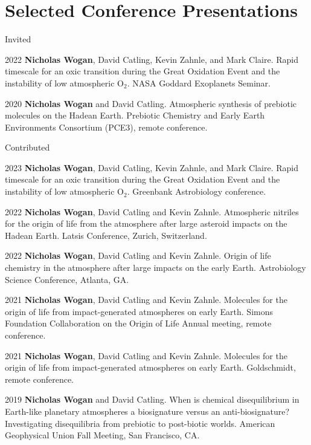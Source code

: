 \documentclass{article}
\begin{document}
\section{Selected Conference Presentations}

\noindent Invited

\begin{cvlist}
\item[2022]
  \textbf{Nicholas Wogan}, David Catling, Kevin Zahnle, and Mark Claire. Rapid timescale for an oxic transition during the Great Oxidation Event and the instability of low atmospheric O$_2$. NASA Goddard Exoplanets Seminar.
\item[2020] 
  \textbf{Nicholas Wogan} and David Catling. Atmospheric synthesis of prebiotic molecules on the Hadean Earth. Prebiotic Chemistry and Early Earth Environments Consortium (PCE3), remote conference.
\end{cvlist}

\noindent Contributed

\begin{cvlist}
\item[2023]
  \textbf{Nicholas Wogan}, David Catling, Kevin Zahnle, and Mark Claire. Rapid timescale for an oxic transition during the Great Oxidation Event and the instability of low atmospheric O$_2$. Greenbank Astrobiology conference.
\item[2022]
  \textbf{Nicholas Wogan}, David Catling and Kevin Zahnle. Atmospheric nitriles for the origin of life from the atmosphere after large asteroid impacts on the Hadean Earth. Latsis Conference, Zurich, Switzerland.
\item[2022]
  \textbf{Nicholas Wogan}, David Catling and Kevin Zahnle. Origin of life chemistry in the atmosphere after large impacts on the early Earth. Astrobiology Science Conference, Atlanta, GA.
\item[2021]
  \textbf{Nicholas Wogan}, David Catling and Kevin Zahnle. Molecules for the origin of life from impact-generated atmospheres on early Earth. Simons Foundation Collaboration on the Origin of Life Annual meeting, remote conference.
\item[2021]
  \textbf{Nicholas Wogan}, David Catling and Kevin Zahnle. Molecules for the origin of life from impact-generated atmospheres on early Earth. Goldschmidt, remote conference.
\item[2019]
  \textbf{Nicholas Wogan} and David Catling. When is chemical disequilibrium in Earth-like planetary atmospheres a biosignature versus an anti-biosignature? Investigating disequilibria from prebiotic to post-biotic worlds. American Geophysical Union Fall Meeting, San Francisco, CA.
\end{cvlist}
\end{document}
